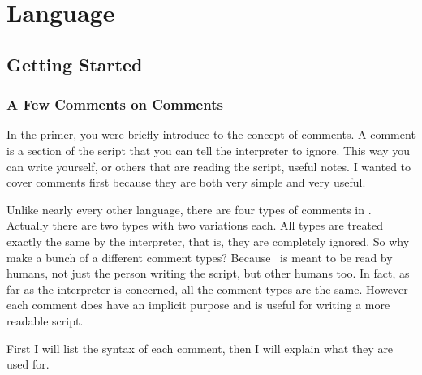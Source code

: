 

\part{Language}

%
%
\chapter{Getting Started}

\section{A Few Comments on Comments}

In the primer, you were briefly introduce to the concept of comments.  A comment is a section of the script that you can tell the interpreter to ignore.  This way you can write yourself, or others that are reading the script, useful notes. I wanted to cover comments first because they are both very simple and very useful.

Unlike nearly every other language, there are four types of comments in \SSquared.  Actually there are two types with two variations each.  All types are treated exactly the same by the interpreter, that is, they are completely ignored.  So why make a bunch of a different comment types?  Because \SSquared\ is meant to be read by humans, not just the person writing the script, but other humans too.  In fact, as far as the interpreter is concerned, all the comment types are the same.  However each comment does have an implicit purpose and is useful for writing a more readable script.

First I will list the syntax of each comment, then I will explain what they are used for.

\begin{SSCodeBox}
 \\
\scitea{} \\
\scitea{} \\
\scitek{/* } \\
 \\
 \\
\scitek{*/}
\scitea{} \\
\scitea{} \\
 \\
\scitea{} \\
\scitea{} \\
 \\
 \\
 \\
\scitea{} \\
\end{SSCodeBox}

